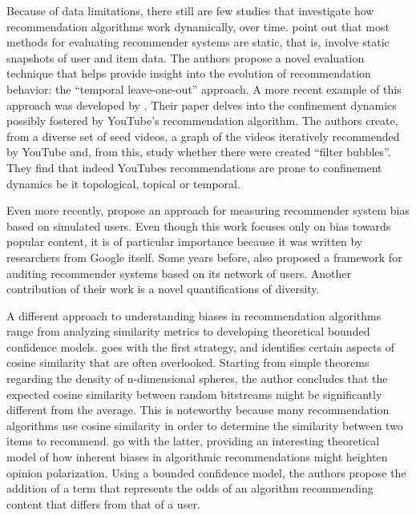 Because of data limitations, there still are few studies that investigate how
recommendation algorithms work dynamically, over time.
\citet{burke_evaluating_2010} point out that most methods for evaluating
recommender systems are static, that is, involve static snapshots of user and
item data. The authors propose a novel evaluation technique that helps provide
insight into the evolution of recommendation behavior: the ``temporal
leave-one-out'' approach. A more recent example of this approach was developed
by \citet{roth_tubes_2020}. Their paper delves into the confinement dynamics
possibly fostered by YouTube's recommendation algorithm. The authors create,
from a diverse set of seed videos, a graph of the videos iteratively recommended
by YouTube and, from this, study whether there were created ``filter bubbles''.
They find that indeed YouTubes recommendations are prone to confinement dynamics
be it topological, topical or temporal.

Even more recently, \citet{yao_measuring_2021} propose an approach for measuring
recommender system bias based on simulated users. Even though this work focuses
only on bias towards popular content, it is of particular importance because it
was written by researchers from Google itself. Some years before,
\citet{dash_network-centric_2019} also proposed a framework for auditing
recommender systems based on its network of users. Another contribution of their
work is a novel quantifications of diversity.

A different approach to understanding biases in recommendation algorithms range
from analyzing similarity metrics to developing theoretical bounded confidence
models. \citet{giller_statistical_2012} goes with the first strategy, and
identifies certain aspects of cosine similarity that are often overlooked.
Starting from simple theorems regarding the density of n-dimensional spheres,
the author concludes that the expected cosine similarity between random
bitstreams might be significantly different from the average. This is noteworthy
because many recommendation algorithms use cosine similarity in order to
determine the similarity between two items to recommend.
\citet{sirbu_algorithmic_2019} go with the latter, providing an interesting
theoretical model of how inherent biases in algorithmic recommendations might
heighten opinion polarization. Using a bounded confidence model, the authors
propose the addition of a term that represents the odds of an algorithm
recommending content that differs from that of a user.

